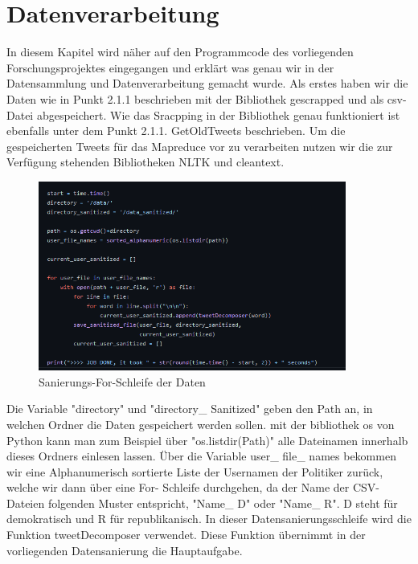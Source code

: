 \section{Datenverarbeitung}
	
	In diesem Kapitel wird näher auf den Programmcode des vorliegenden Forschungsprojektes eingegangen und erklärt was genau wir in der Datensammlung und 
	Datenverarbeitung gemacht wurde. 
	Als erstes haben wir die Daten wie in Punkt 2.1.1 beschrieben mit der Bibliothek gescrapped und als csv-Datei abgespeichert. Wie das Sracpping in der 
	Bibliothek genau funktioniert ist ebenfalls unter dem Punkt 2.1.1. GetOldTweets beschrieben. Um die gespeicherten Tweets für das Mapreduce vor zu 
	verarbeiten nutzen wir die zur Verfügung stehenden Bibliotheken NLTK und cleantext.
	
	
	\begin{figure}[ht]
		\centering
		\includegraphics[width=0.9\textwidth]{images/Kapitel2/Code_Datensanierung_1}
		\caption{\label{fig:DataSan}Sanierungs-For-Schleife der Daten}
	\end{figure}
	
	Die Variable "directory" und "directory\_ Sanitized" geben den Path an, in welchen Ordner die Daten gespeichert werden sollen. mit der bibliothek os von Python 
	kann man zum Beispiel über "os.listdir(Path)" alle Dateinamen innerhalb dieses Ordners einlesen lassen. 
	Über die Variable user\_ file\_ names bekommen wir eine Alphanumerisch sortierte Liste der Usernamen der Politiker zurück, welche wir dann über eine For-
	Schleife durchgehen, da der Name der CSV-Dateien folgenden Muster entspricht, "Name\_ D" oder "Name\_ R". D steht für demokratisch und R für 
	republikanisch. In dieser Datensanierungsschleife wird die Funktion tweetDecomposer verwendet. Diese Funktion übernimmt in der vorliegenden Datensanierung die 
	Hauptaufgabe.
	
